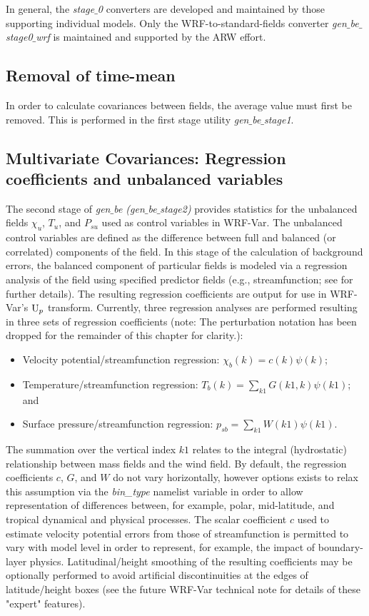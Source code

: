 In general, the {\it stage$\_$0} converters are developed and maintained by those supporting
individual models. Only the WRF-to-standard-fields converter {\it gen$\_$be$\_$stage0$\_$wrf} 
is maintained and supported by the ARW effort.

\subsection{Removal of time-mean}

In order to calculate covariances between fields, the average value must first be removed. 
This is performed in the first stage utility {\it gen$\_$be$\_$stage1}. 

\subsection{Multivariate Covariances: Regression coefficients and unbalanced variables}

The second stage
of {\it gen$\_$be (gen$\_$be$\_$stage2)} provides statistics for the
unbalanced fields $\chi_u$, $T_u$, and $P_{su}$ used as control
variables in WRF-Var. The unbalanced control variables are defined as
the difference between full and balanced (or correlated) components of
the field. In this stage of the calculation of background errors, the
balanced component of particular fields is modeled via a regression
analysis of the field using specified predictor fields
(e.g., streamfunction; see
\citet{wu02} for further details). The resulting regression coefficients 
are output for use 
in WRF-Var's ${\rm U}_p$ transform. Currently, three regression analyses are
performed resulting in three sets of regression coefficients (note:
The perturbation notation has been dropped for the 
remainder of this chapter for clarity.):

\begin{itemize}\setlength{\parskip}{-4pt}
\item   Velocity potential/streamfunction regression: $\chi_b(k)=c(k)\psi(k)$;
\item	Temperature/streamfunction regression: $T_b(k)=\sum_{k1}G(k1,k)\psi(k1)$; and
\item	Surface pressure/streamfunction regression: $p_{sb}=\sum_{k1}W(k1)\psi(k1)$.
\end{itemize}

The summation over the vertical index $k1$ relates to the integral (hydrostatic) relationship between
mass fields and the wind field. By default, the regression coefficients $c$, $G$, and $W$ do 
not vary horizontally, however options exists to relax this assumption via the {\it bin\_type} 
namelist variable in order to allow representation of differences between, for example, polar, mid-latitude, and tropical dynamical and physical processes. The scalar coefficient $c$ used to 
estimate velocity potential errors from those of streamfunction is permitted to vary with model
level in order to represent, for example, the impact of boundary-layer physics. Latitudinal/height 
smoothing of the resulting coefficients may be optionally performed to avoid artificial 
discontinuities at the edges of latitude/height boxes (see the future WRF-Var technical note for
details of these "expert" features).

